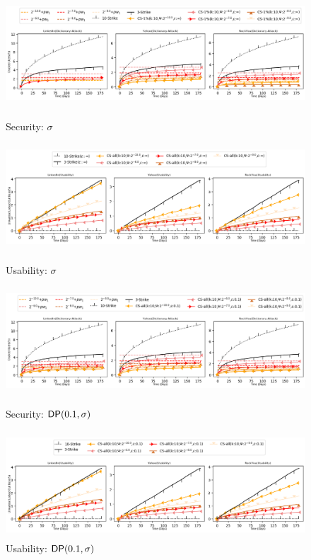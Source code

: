 \clearpage
\begin{figure}[htb]
	\includegraphics[width=\linewidth,height=4cm]{Figures/Experiments/Attacker/Security_Appendix.png}
	\caption{Security: $\sigma$}\label{figure:appendix_attacker}
	\includegraphics[width=\linewidth,height=4cm]{Figures/Experiments/Utility/Usability_Appendix.png}
	\caption{Usability:  $\sigma$}\label{figure:appendix_usability}
	\includegraphics[width=\linewidth,height=4cm]{Figures/Experiments/Attacker/Security_Appendix_dp.png}
	\caption{Security: $\textsf{DP}(0.1,\sigma)$}\label{figure:appendix_attacker_dp}
	\includegraphics[width=\linewidth,height=4cm]{Figures/Experiments/Utility/Usability_Appendix_dp.png} 
	\caption{Usability: $\textsf{DP}(0.1,\sigma)$}\label{figure:appendix_usability_dp}
\end{figure}
